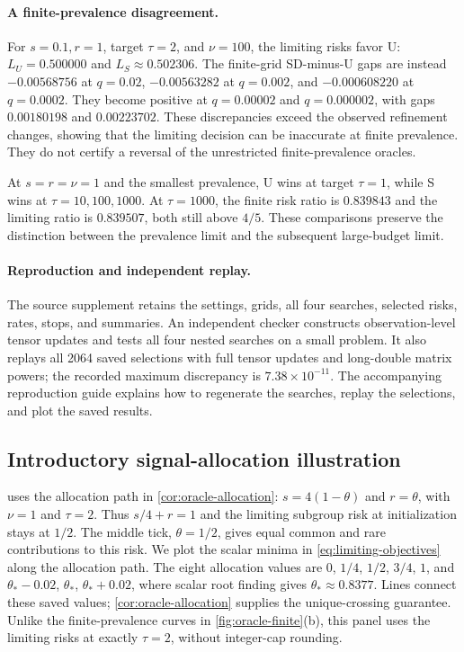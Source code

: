 \documentclass{alt2027}
\begin{document}
\paragraph{A finite-prevalence disagreement.}

For $s = 0.1,r = 1$, target $\tau = 2$, and $\nu = 100$, the limiting risks
favor U: $L_U = 0.500000$ and $L_S \approx 0.502306$. The finite-grid SD-minus-U
gaps are instead $-0.00568756$ at $q = 0.02$, $-0.00563282$ at $q = 0.002$, and
$-0.000608220$ at $q = 0.0002$. They become positive at $q = 0.00002$ and
$q = 0.000002$, with gaps $0.00180198$ and $0.00223702$. These discrepancies
exceed the observed refinement changes, showing that the limiting decision can
be inaccurate at finite prevalence. They do not certify a reversal of the
unrestricted finite-prevalence oracles.

At $s = r = \nu = 1$ and the smallest prevalence, U wins at target $\tau = 1$,
while S wins at $\tau = 10,100,1000$. At $\tau = 1000$, the finite risk ratio is
$0.839843$ and the limiting ratio is $0.839507$, both still above $4/5$. These
comparisons preserve the distinction between the prevalence limit and the
subsequent large-budget limit.

\paragraph{Reproduction and independent replay.}

The source supplement retains the settings, grids, all four searches, selected
risks, rates, stops, and summaries. An independent checker constructs
observation-level tensor updates and tests all four nested searches on a small
problem. It also replays all 2064 saved selections with full tensor updates and
long-double matrix powers; the recorded maximum discrepancy is
$7.38 \times 10^{-11}$. The accompanying reproduction guide explains how to
regenerate the searches, replay the selections, and plot the saved results.

\subsection{Introductory signal-allocation illustration}
\label{sec:signal-allocation}

 uses the allocation path in
\cref{cor:oracle-allocation}: $s = 4(1 - \theta)$ and $r = \theta$, with
$\nu = 1$ and $\tau = 2$. Thus $s/4 + r = 1$ and the limiting subgroup risk at
initialization stays at $1/2$. The middle tick, $\theta = 1/2$, gives equal
common and rare contributions to this risk. We plot the scalar minima in
\cref{eq:limiting-objectives} along the allocation path. The eight allocation
values are $0$, $1/4$, $1/2$, $3/4$, $1$, and $\theta_* - 0.02$, $\theta_*$,
$\theta_* + 0.02$, where scalar root finding gives $\theta_* \approx 0.8377$.
Lines connect these saved values; \cref{cor:oracle-allocation} supplies the
unique-crossing guarantee. Unlike the finite-prevalence curves in
\cref{fig:oracle-finite}(b), this panel uses the limiting risks at exactly
$\tau = 2$, without integer-cap rounding.
\end{document}
